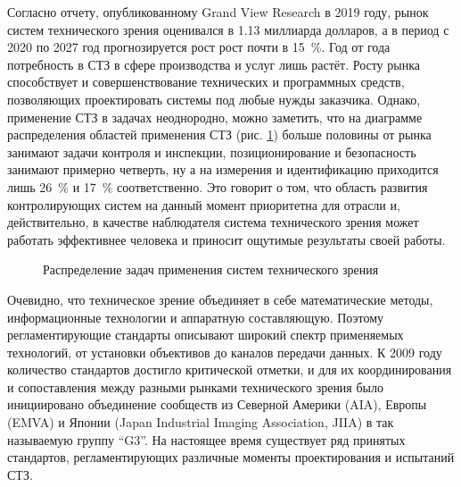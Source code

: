 Согласно отчету, опубликованному Grand View Research в 2019 году, рынок систем технического зрения оценивался в 1.13 миллиарда долларов, а в период с 2020 по 2027 год прогнозируется рост рост почти в 15~\%. Год от года потребность в СТЗ в сфере производства и услуг лишь растёт. Росту рынка способствует и совершенствование технических и программных средств, позволяющих проектировать системы под любые нужды заказчика. Однако, применение СТЗ в задачах неоднородно, можно заметить, что на диаграмме распределения областей применения СТЗ (рис. \cref{fig:3d-vis-market}) больше половины от рынка занимают задачи контроля и инспекции, позиционирование и безопасность занимают примерно четверть, ну а на измерения и идентификацию приходится лишь 26~\% и 17~\% соответственно. Это говорит о том, что область развития контролирующих систем на данный момент приоритетна для отрасли и, действительно, в качестве наблюдателя система технического зрения может работать эффективнее человека и приносит ощутимые результаты своей работы.

\begin{figure}[ht]
	\caption{Распределение задач применения систем технического зрения}\label{fig:3d-vis-market}
\end{figure}

Очевидно, что техническое зрение объединяет в себе математические методы, информационные технологии и аппаратную составляющую. Поэтому регламентирующие стандарты описывают широкий спектр применяемых технологий, от установки объективов до каналов передачи данных. К 2009 году количество стандартов достигло критической отметки, и для их координирования и сопоставления между разными рынками технического зрения было инициировано объединение сообществ из Северной Америки (AIA), Европы (EMVA) и Японии (Japan Industrial Imaging Association, JIIA) в так называемую группу ``G3''. На настоящее время существует ряд принятых стандартов, регламентирующих различные моменты проектирования и испытаний СТЗ.

